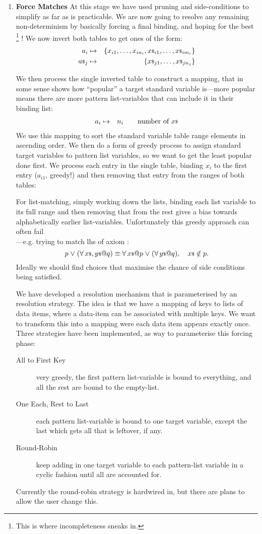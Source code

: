 \begin{enumerate}
\item

\textbf{Force Matches}
At this stage we have used pruning and side-conditions
to simplify as far as is practicable.
We are now going to resolve any remaining non-determinism
by basically forcing a final binding,
and hoping for the best%
\footnote{This is where incompleteness sneaks in.}%
!
We now invert both tables to get ones of the form:
 \begin{eqnarray*}
   a_i &\mapsto& \{x_{i1},\ldots,x_{in_i}, {x}{\scriptstyle\$}_{i1},\ldots,{x}{\scriptstyle\$}_{im_i}\}
 \\ {a}{\scriptstyle\$}_j &\mapsto& \{ {x}{\scriptstyle\$}_{j1},\ldots,{x}{\scriptstyle\$}_{jn_j}\}
 \end{eqnarray*}

We then process the single inverted table to construct a mapping,
that in some sense shows how ``popular'' a target standard variable
is---more popular means there are more pattern list-variables
that can include it in their binding list:
\begin{eqnarray*}
  a_i &\mapsto& n_i \qquad \mbox{number of ${x}{\scriptstyle\$}$}
\end{eqnarray*}
We use this mapping to sort the standard variable table range elements in ascending order.
We then do a form of greedy process to assign standard target variables
to pattern list variables, so we want to get the least popular done first.
We process each entry in the single table,
binding $x_i$ to the first entry ($a_{i1}$, greedy!) and then removing that entry
from the ranges of both tables:

For list-matching, simply working down the lists, binding each list variable
to its full range and then removing that from the rest
gives a bias towards alphabetically earlier list-variables.
Unfortunately this greedy approach can often fail
\\---e.g. trying to match lhs of axiom \AXorAllOScopeN:
$$\AXorAllOScope.$$
Ideally we should find choices that maximise the chance of side conditions
being satisfied.

We have developed a resolution mechanism
that is parameterised by an resolution strategy.
The idea is that we have a mapping of keys to lists of data items,
where a data-item can be associated with multiple keys.
We want to transform this into a mapping were each data item
appears exactly once.
Three strategies have been implemented,
as way to parameterise this forcing phase:
\begin{description}
  \item[All to First Key] very greedy,
  the first pattern list-variable is bound to everything,
   and all the rest are bound to the empty-list.
  \item[One Each, Rest to Last]
    each pattern list-variable is bound to one target variable,
    except the last which gets all that is leftover, if any.
  \item[Round-Robin]
    keep adding in one target variable to each pattern-list variable
    in a cyclic fashion until all are accounted for.
\end{description}
Currently the round-robin strategy is hardwired in,
but there are plans to allow the user change this.


\end{enumerate}
